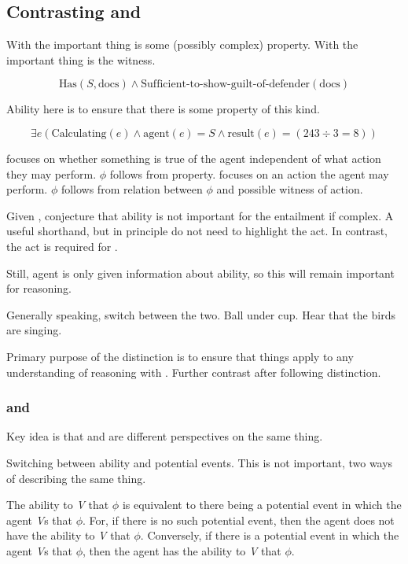 \subsection{Contrasting \AR{} and \WR{}}
\label{sec:contrasting-ar-wr}

\begin{note}[Difference]
  With \AR{} the important thing is some (possibly complex) property.
  With \WR{} the important thing is the witness.

  \[\text{Has}(S,\text{docs}) \land \text{Sufficient-to-show-guilt-of-defender}(\text{docs})\]

  Ability here is to ensure that there is some property of this kind.

  \[\exists e(\text{Calculating}(e) \land \text{agent}(e) = S \land \text{result}(e) = (243 \div 3 = 8))\]


  \AR{} focuses on whether something is true of the agent independent of what action they may perform.
  \(\phi\) follows from property.
  \WR{} focuses on an action the agent may perform.
  \(\phi\) follows from relation between \(\phi\) and possible witness of action.
\end{note}

\begin{note}
  Given \AR{}, conjecture that ability is not important for the entailment if complex.
  A useful shorthand, but in principle do not need to highlight the act.
  In contrast, the act is required for \WR{}.

  Still, agent is only given information about ability, so this will remain important for reasoning.
\end{note}

\begin{note}
  Generally speaking, switch between the two.
  Ball under cup.
  Hear that the birds are singing.
\end{note}

\begin{note}
  Primary purpose of the distinction is to ensure that things apply to any understanding of reasoning with .
  Further contrast after following distinction.
\end{note}

\subsubsection{\AR{} and \WR{}}

\begin{note}
  Key idea is that \AR{} and \WR{} are different perspectives on the same thing.

  Switching between ability and potential events.
  This is not important, two ways of describing the same thing.

  The ability to \emph{V} that \(\phi\) is equivalent to there being a potential event in which the agent \emph{V}s that \(\phi\).
  For, if there is no such potential event, then the agent does not have the ability to \emph{V} that \(\phi\).
  Conversely, if there is a potential event in which the agent \emph{V}s that \(\phi\), then the agent has the ability to \emph{V} that \(\phi\).
\end{note}

